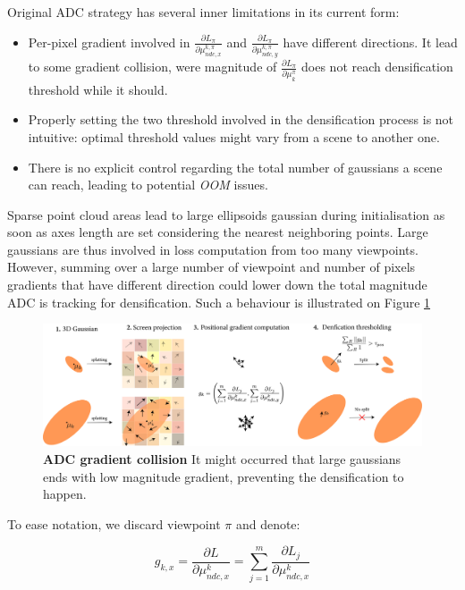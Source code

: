 Original ADC strategy has several inner limitations in its current form: 
\begin{itemize}
    \item Per-pixel gradient involved in $\frac{\partial L_{\pi}}{\partial \mu^{k,\pi}_{ndc,x}}$ and $\frac{\partial L_{\pi}}{\partial \mu^{k,\pi}_{ndc,y}}$  have different directions. It lead to some gradient collision, were magnitude of $\frac{\partial L_{\pi}}{\partial \mu_{k}^{\pi}}$ does not reach densification threshold while it should. 
    \item Properly setting the two threshold involved in the densification process is not intuitive: optimal threshold values might vary from a scene to another one. 
    \item There is no explicit control regarding the total number of gaussians a scene can reach, leading to potential \textit{OOM} issues.
\end{itemize}

Sparse point cloud areas lead to large ellipsoids gaussian during initialisation as soon as axes length are set considering the nearest neighboring points. Large gaussians are thus involved in loss computation from too many viewpoints. However, summing over a large number of viewpoint and  number of pixels gradients that have different direction could lower down the total magnitude ADC is tracking for densification. Such a behaviour is illustrated on Figure \ref{fig:adc-limitation}



\begin{figure}[htbp!]
    \center
  \includegraphics[width=\linewidth]{images/gaussiansplatting/adc_limitation.png}
  \caption{\textbf{ADC gradient collision} It might occurred that large gaussians ends with low magnitude gradient, preventing the densification to happen.}
  \label{fig:adc-limitation}
\end{figure}



To ease notation, we discard viewpoint $\pi$ and denote: 


\begin{equation}
\label{eq:grad-inter}
    g_{k,x} = \frac{\partial L}{\partial \mu^{k}_{ndc,x}} = \sum \limits_{j=1}^{m} \frac{\partial L_{j}}{\partial \mu^{k}_{ndc,x}} 
\end{equation}

